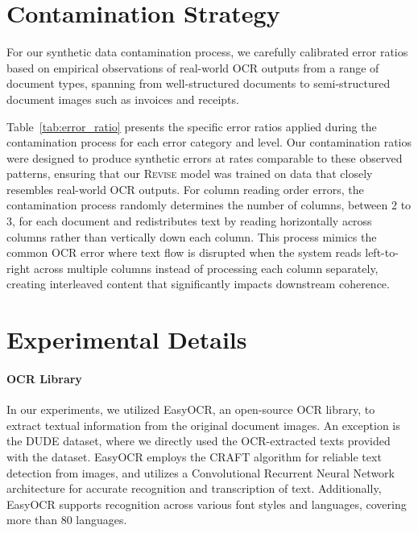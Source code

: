 \documentclass[11pt]{article}
\begin{document}


\appendix


\section{Contamination Strategy}

For our synthetic data contamination process, we carefully calibrated error ratios based on empirical observations of real-world OCR outputs from a range of document types, spanning from well-structured documents to semi-structured document images such as invoices and receipts. 

Table~\ref{tab:error_ratio} presents the specific error ratios applied during the contamination process for each error category and level.
Our contamination ratios were designed to produce synthetic errors at rates comparable to these observed patterns, ensuring that our \textsc{Revise} model was trained on data that closely resembles real-world OCR outputs. 
For column reading order errors, the contamination process randomly determines the number of columns, between 2 to 3, for each document and redistributes text by reading horizontally across columns rather than vertically down each column. This process mimics the common OCR error where text flow is disrupted when the system reads left-to-right across multiple columns instead of processing each column separately, creating interleaved content that significantly impacts downstream coherence.
\label{apx:cp}






\section{Experimental Details}
\paragraph{OCR Library}
In our experiments, we utilized EasyOCR, an open-source OCR library, to extract textual information from the original document images. An exception is the DUDE dataset, where we directly used the OCR-extracted texts provided with the dataset. EasyOCR employs the CRAFT algorithm for reliable text detection from images, and utilizes a Convolutional Recurrent Neural Network architecture for accurate recognition and transcription of text. Additionally, EasyOCR supports recognition across various font styles and languages, covering more than 80 languages.
\end{document}
